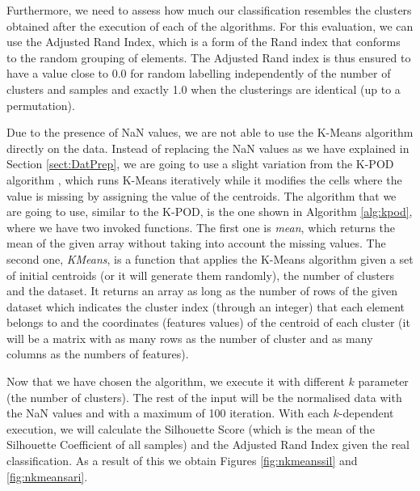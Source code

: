 Furthermore, we need to assess how much our classification resembles the clusters obtained after the execution of each of the algorithms. For this evaluation, we can use the Adjusted Rand Index, which is a form of the Rand index \citep{rand1971objective} that conforms to the random grouping of elements. The Adjusted Rand index is thus ensured to have a value close to 0.0 for random labelling independently of the number of clusters and samples and exactly 1.0 when the clusterings are identical (up to a permutation).

Due to the presence of NaN values, we are not able to use the K-Means algorithm directly on the data. Instead of replacing the NaN values as we have explained in Section \ref{sect:DatPrep}, we are going to use a slight variation from the K-POD algorithm \citep{chi2016k}, which runs K-Means iteratively while it modifies the cells where the value is missing by assigning the value of the centroids. The algorithm that we are going to use, similar to the K-POD, is the one shown in Algorithm \ref{alg:kpod}, where we have two invoked functions. The first one is \textit{mean}, which returns the mean of the given array without taking into account the missing values. The second one, \textit{KMeans}, is a function that applies the K-Means algorithm given a set of initial centroids (or it will generate them randomly), the number of clusters and the dataset. It returns an array as long as the number of rows of the given dataset which indicates the cluster index (through an integer) that each element belongs to and the coordinates (features values) of the centroid of each cluster (it will be a matrix with as many rows as the number of cluster and as many columns as the numbers of features).

Now that we have chosen the algorithm, we execute it with different $k$ parameter (the number of clusters). The rest of the input will be the normalised data with the NaN values and with a maximum of 100 iteration. With each $k$-dependent execution, we will calculate the Silhouette Score (which is the mean of the Silhouette Coefficient of all samples) and the Adjusted Rand Index given the real classification. As a result of this we obtain Figures \ref{fig:nkmeanssil} and \ref{fig:nkmeansari}.

